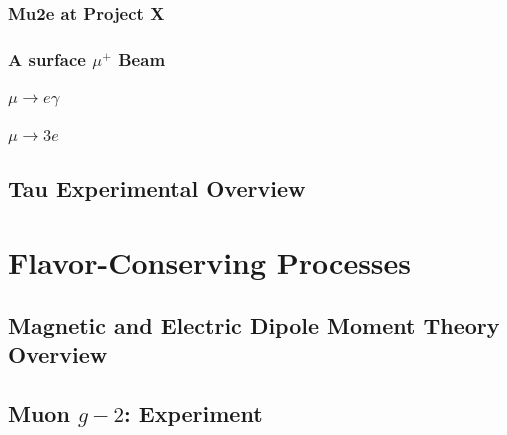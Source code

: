 \subsection{Mu2e at Project X}
\vskip -12pt


\subsection{A surface $\mu^+$ Beam}
\vskip -12pt


\subsection{$\mu \to e \gamma$}
\vskip -12pt


\subsection{$\mu \to 3e$}
\vskip -12pt



\section{Tau Experimental Overview}\label{sec:cl:tauexp}
\vskip -12pt

%


\chapter{Flavor-Conserving Processes}\label{sec:cl:fcp}
\medskip
\section{Magnetic and Electric Dipole Moment Theory Overview}\label{sec:cl:fct}
\vskip -12pt


\section{Muon $g-2$:  Experiment}
\vskip -12pt


